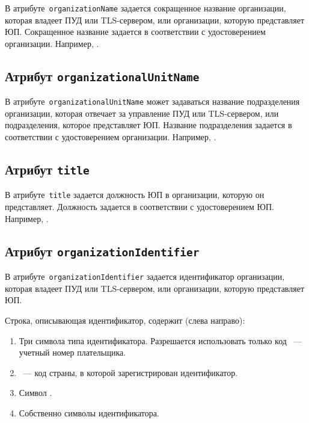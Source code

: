 В атрибуте~\texttt{organizationName} задается сокращенное название организации,
которая владеет ПУД или TLS-сервером, или организации, которую 
представляет ЮП.
%
Сокращенное название задается в соответствии с удостоверением организации. 
Например, .  

\subsection{Атрибут \texttt{organizationalUnitName}}\label{ENTITIES.Id.OU}

В атрибуте~\texttt{organizationalUnitName} может задаваться название 
подразделения организации, которая отвечает за управление ПУД или TLS-сервером, 
или подразделения, которое представляет ЮП.
%
Название подразделения задается в соответствии с удостоверением 
организации. Например, . 

\subsection{Атрибут \texttt{title}}\label{ENTITIES.Id.T}

В атрибуте~\texttt{title} задается должность ЮП в организации, которую он 
представляет. 
%
Должность задается в соответствии с удостоверением ЮП. Например, 
.   

\subsection{Атрибут \texttt{organizationIdentifier}}\label{ENTITIES.Id.ORGID}

В атрибуте~\texttt{organizationIdentifier} задается идентификатор организации,
которая владеет ПУД или TLS-сервером, или организации, которую 
представляет ЮП.

Строка, описывающая идентификатор, содержит (слева направо):
\begin{enumerate}
\item
Три символа типа идентификатора.
Разрешается использовать только код 
~--- учетный номер плательщика.

\item
{}~--- код страны, в которой зарегистрирован идентификатор.

\item
Символ \str{-}.
\item
Собственно символы идентификатора.
\end{enumerate}

